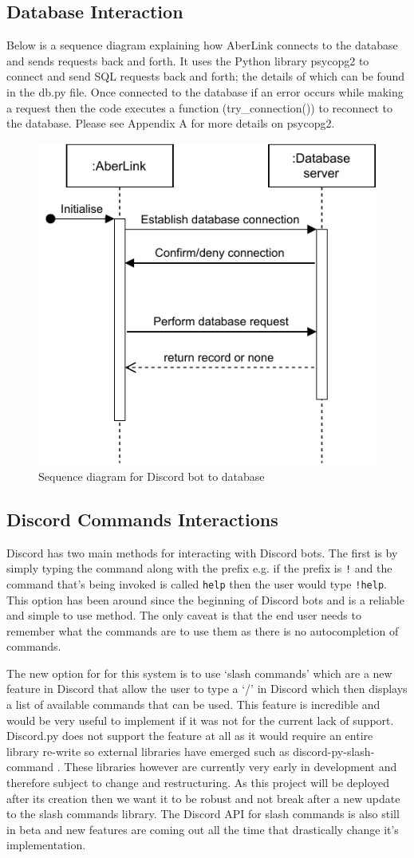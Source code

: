 \subsection{Database Interaction}
Below is a sequence diagram explaining how AberLink connects to the database and sends requests back and forth. It uses the Python library psycopg2 \cite{psycopg2} to connect and send SQL requests back and forth; the details of which can be found in the db.py file. Once connected to the database if an error occurs while making a request then the code executes a function (try\_connection()) to reconnect to the database. Please see Appendix A for more details on psycopg2.
\begin{figure}[H]
	\centering
	\includegraphics[width=0.5\linewidth]{Figures/aberlink-sequence}
	\caption{Sequence diagram for Discord bot to database}
	\label{fig:architecture-dis-seq}
\end{figure}

\subsection{Discord Commands Interactions}
Discord has two main methods for interacting with Discord bots. The first is by simply typing the command along with the prefix e.g. if the prefix is \verb|!| and the command that's being invoked is called \verb|help| then the user would type \verb|!help|. This option has been around since the beginning of Discord bots and is a reliable and simple to use method. The only caveat is that the end user needs to remember what the commands are to use them as there is no autocompletion of commands. 

The new option for for this system is to use `slash commands' which are a new feature in Discord that allow the user to type a `/' in Discord which then displays a list of available commands that can be used. This feature is incredible and would be very useful to implement if it was not for the current lack of support. Discord.py \cite{discord.py} does not support the feature at all as it would require an entire library re-write so external libraries have emerged such as discord-py-slash-command \cite{discord.py-slash}. These libraries however are currently very early in development and therefore subject to change and restructuring. As this project will be deployed after its creation then we want it to be robust and not break after a new update to the slash commands library. The Discord API for slash commands is also still in beta and new features are coming out all the time that drastically change it's implementation.

